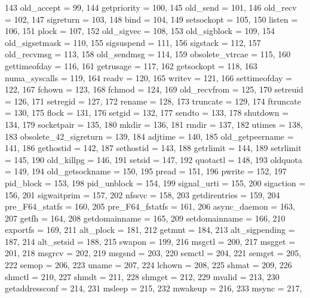 \begin{DoxyCode}
{143         old_accept = 99,
144         getpriority = 100,
145         old_send = 101,
146         old_recv = 102,
147         sigreturn = 103,
148         bind = 104,
149         setsockopt = 105,
150         listen = 106,
151         plock = 107,
152         old_sigvec = 108,
153         old_sigblock = 109,
154         old_sigsetmask = 110,
155         sigsuspend = 111,
156         sigstack = 112,
157         old_recvmsg = 113,
158         old_sendmsg = 114,
159         obsolete_vtrcae = 115,
160         gettimeofday = 116,
161         getrusage = 117,
162         getsockopt = 118,
163         numa_syscalls = 119,
164         readv = 120,
165         writev = 121,
166         settimeofday = 122,
167         fchown = 123,
168         fchmod = 124,
169         old_recvfrom = 125,
170         setreuid = 126,
171         setregid = 127,
172         rename = 128,
173         truncate = 129,
174         ftruncate = 130,
175         flock = 131,
176         setgid = 132,
177         sendto = 133,
178         shutdown = 134,
179         socketpair = 135,
180         mkdir = 136,
181         rmdir = 137,
182         utimes = 138,
183         obsolete_42_sigreturn = 139,
184         adjtime = 140,
185         old_getpeername = 141,
186         gethostid = 142,
187         sethostid = 143,
188         getrlimit = 144,
189         setrlimit = 145,
190         old_killpg = 146,
191         setsid = 147,
192         quotactl = 148,
193         oldquota = 149,
194         old_getsockname = 150,
195         pread = 151,
196         pwrite = 152,
197         pid_block = 153,
198         pid_unblock = 154,
199         signal_urti = 155,
200         sigaction = 156,
201         sigwaitprim = 157,
202         nfssvc = 158,
203         getdirentries = 159,
204         pre_F64_statfs = 160,
205         pre_F64_fstatfs = 161,
206         async_daemon = 163,
207         getfh = 164,
208         getdomainname = 165,
209         setdomainname = 166,
210         exportfs = 169,
211         alt_plock = 181,
212         getmnt = 184,
213         alt_sigpending = 187,
214         alt_setsid = 188,
215         swapon = 199,
216         msgctl = 200,
217         msgget = 201,
218         msgrcv = 202,
219         msgsnd = 203,
220         semctl = 204,
221         semget = 205,
222         semop = 206,
223         uname = 207,
224         lchown = 208,
225         shmat = 209,
226         shmctl = 210,
227         shmdt = 211,
228         shmget = 212,
229         mvalid = 213,
230         getaddressconf = 214,
231         msleep = 215,
232         mwakeup = 216,
233         msync = 217,
}
\end{DoxyCode}
